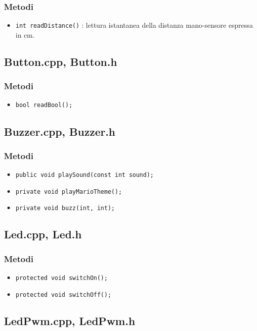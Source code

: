 \subsubsection{Metodi}
\begin{itemize}
	\item \texttt{int readDistance()} : lettura istantanea della distanza mano-sensore espressa in cm.
\end{itemize}

\subsection{Button.cpp, Button.h}
\subsubsection{Metodi}
\begin{itemize}
	\item \texttt{bool readBool();}
\end{itemize}

\subsection{Buzzer.cpp, Buzzer.h}
\subsubsection{Metodi}
\begin{itemize}
	\item \texttt{public void playSound(const int sound);}
	\item \texttt{private void playMarioTheme();}
	\item \texttt{private void buzz(int, int);}
\end{itemize}

\subsection{Led.cpp, Led.h}
\subsubsection{Metodi}
\begin{itemize}
	\item \texttt{protected	void switchOn();}
	\item \texttt{protected	void switchOff();}
\end{itemize}

\subsection{LedPwm.cpp, LedPwm.h}
